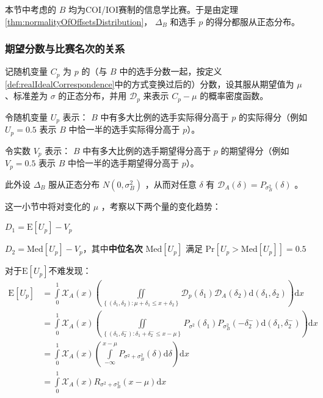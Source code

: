         本节中考虑的 $B$ 均为COI/IOI赛制的信息学比赛。于是由定理\ref{thm:normalityOfOffsetsDistribution}， $\Delta_B$ 和选手 $p$ 的得分都服从正态分布。

        \subsubsection{期望分数与比赛名次的关系}

            记随机变量 $C_p$ 为 $p$ 的（与 $B$ 中的选手分数一起，按定义\ref{def:realIdealCorrespondence}中的方式变换过后的）分数，设其服从期望值为 $\mu$ 、标准差为 $\sigma$ 的正态分布，并用 $\mathcal{D}_p$ 来表示 $C_p-\mu$ 的概率密度函数。

            令随机变量 $U_p$ 表示： $B$ 中有多大比例的选手实际得分高于 $p$ 的实际得分（例如 $U_p=0.5$ 表示 $B$ 中恰一半的选手实际得分高于 $p$）。

            令实数 $V_p$ 表示： $B$ 中有多大比例的选手期望得分高于 $p$ 的期望得分（例如 $V_p=0.5$ 表示 $B$ 中恰一半的选手期望得分高于 $p$）。

            此外设 $\Delta_B$ 服从正态分布 $N(0,\sigma_B^2)$ ，从而对任意 $\delta$ 有 $\mathcal{D}_A(\delta)=P_{\sigma_B^2}(\delta)$ 。

            \vspace{1.5ex}

            这一小节中将对变化的 $\mu$ ，考察以下两个量的变化趋势：
            \begin{asparaitem}
                \item $D_1=\mathrm{E}\left[U_p\right]-V_p$
                \item $D_2=\mathrm{Med}\left[U_p\right]-V_p$，其中\textbf{中位名次} $\mathrm{Med}\left[U_p\right]$ 满足 $\mathrm{Pr}\left[U_p>\mathrm{Med}\left[U_p\right]\right]=0.5$ 
            \end{asparaitem}

            \vspace{1.5ex}

            对于$\mathrm{E}\left[U_p\right]$不难发现：
            \begin{align*}
                \mathrm{E}\left[U_p\right]
                &=\int\limits_0^1 \mathcal{X}_A(x)\left(\iint\limits_{\left\{(\delta_1,\delta_2):\mu+\delta_1\leq x+\delta_2\right\}} \mathcal{D}_p(\delta_1)\mathcal{D}_A(\delta_2)\mathrm{d}(\delta_1,\delta_2)\right)\mathrm{d}x \\
                &=\int\limits_0^1 \mathcal{X}_A(x)\left(\iint\limits_{\left\{(\delta_1,\delta_2^-):\delta_1+\delta_2^-\leq x-\mu\right\}} P_{\sigma^2}(\delta_1)P_{\sigma_B^2}(-\delta_2^-)\mathrm{d}(\delta_1,\delta_2^-)\right)\mathrm{d}x \\
                &=\int\limits_0^1 \mathcal{X}_A(x)\left(\int\limits_{-\infty}^{x-\mu} P_{\sigma^2+\sigma_B^2}(\delta)\mathrm{d}\delta\right)\mathrm{d}x \\
                &=\int\limits_0^1 \mathcal{X}_A(x)R_{\sigma^2+\sigma_B^2}(x-\mu) \mathrm{d}x
            \end{align*}

